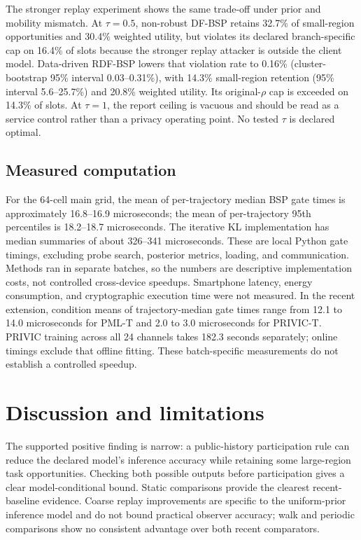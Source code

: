 \documentclass[review,11pt,times]{elsarticle}
\begin{document}
The stronger replay experiment shows the same trade-off under prior and mobility mismatch. At $\tau=0.5$, non-robust DF-BSP retains 32.7\% of small-region opportunities and 30.4\% weighted utility, but violates its declared branch-specific cap on 16.4\% of slots because the stronger replay attacker is outside the client model. Data-driven RDF-BSP lowers that violation rate to 0.16\% (cluster-bootstrap 95\% interval 0.03--0.31\%), with 14.3\% small-region retention (95\% interval 5.6--25.7\%) and 20.8\% weighted utility. Its original-$\rho$ cap is exceeded on 14.3\% of slots. At $\tau=1$, the report ceiling is vacuous and should be read as a service control rather than a privacy operating point. No tested $\tau$ is declared optimal.

\begin{table}[tbp]
\centering
\caption{Disclosure-floor-aware service frontier at $\rho=0.1$. ``$\rho$ exceed.'' reports exceedance of the original local BSP cap; ``Branch viol.'' reports violation of the declared asymmetric caps in Eq.~\eqref{eq:dfcap}. Weighted and small-region retention emphasize fine-grained service. RDF-BSP uses the six validation-selected models.}
\label{tab:dfbsp}{\scriptsize\setlength{\tabcolsep}{3pt}}
\end{table}

\subsection{Measured computation}
For the 64-cell main grid, the mean of per-trajectory median BSP gate times is approximately 16.8--16.9 microseconds; the mean of per-trajectory 95th percentiles is 18.2--18.7 microseconds. The iterative KL implementation has median summaries of about 326--341 microseconds. These are local Python gate timings, excluding probe search, posterior metrics, loading, and communication. Methods ran in separate batches, so the numbers are descriptive implementation costs, not controlled cross-device speedups. Smartphone latency, energy consumption, and cryptographic execution time were not measured. In the recent extension, condition means of trajectory-median gate times range from 12.1 to 14.0 microseconds for PML-T and 2.0 to 3.0 microseconds for PRIVIC-T. PRIVIC training across all 24 channels takes 182.3 seconds separately; online timings exclude that offline fitting. These batch-specific measurements do not establish a controlled speedup.

\section{Discussion and limitations}
The supported positive finding is narrow: a public-history participation rule can reduce the declared model's inference accuracy while retaining some large-region task opportunities. Checking both possible outputs before participation gives a clear model-conditional bound. Static comparisons provide the clearest recent-baseline evidence. Coarse replay improvements are specific to the uniform-prior inference model and do not bound practical observer accuracy; walk and periodic comparisons show no consistent advantage over both recent comparators.
\end{document}
